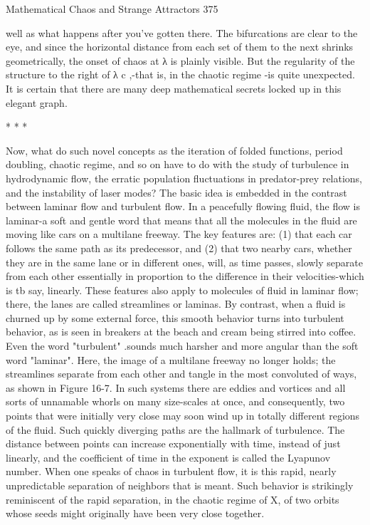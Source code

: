 Mathematical Chaos and Strange Attractors                                             375

well as what happens after you've gotten there. The bifurcations are clear to the eye,
and since the horizontal distance from each set of them to the next shrinks
geometrically, the onset of chaos at λ is plainly visible. But the regularity of the
structure to the right of λ c ,-that is, in the chaotic regime -is quite unexpected. It is
certain that there are many deep mathematical secrets locked up in this elegant graph.

                                        *   *   *

        Now, what do such novel concepts as the iteration of folded functions, period
doubling, chaotic regime, and so on have to do with the study of turbulence in
hydrodynamic flow, the erratic population fluctuations in predator-prey relations, and
the instability of laser modes? The basic idea is embedded in the contrast between
laminar flow and turbulent flow. In a peacefully flowing fluid, the flow is laminar-a
soft and gentle word that means that all the molecules in the fluid are moving like cars
on a multilane freeway. The key features are: (1) that each car follows the same path
as its predecessor, and (2) that two nearby cars, whether they are in the same lane or
in different ones, will, as time passes, slowly separate from each other essentially in
proportion to the difference in their velocities-which is tb say, linearly. These features
also apply to molecules of fluid in laminar flow; there, the lanes are called streamlines
or laminas.
        By contrast, when a fluid is churned up by some external force, this smooth
behavior turns into turbulent behavior, as is seen in breakers at the beach and cream
being stirred into coffee. Even the word "turbulent" .sounds much harsher and more
angular than the soft word "laminar". Here, the image of a multilane freeway no
longer holds; the streamlines separate from each other and tangle in the most
convoluted of ways, as shown in Figure 16-7. In such systems there are eddies and
vortices and all sorts of unnamable whorls on many size-scales at once, and
consequently, two points that were initially very close may soon wind up in totally
different regions of the fluid. Such quickly diverging paths are the hallmark of
turbulence. The distance between points can increase exponentially with time, instead
of just linearly, and the coefficient of time in the exponent is called the Lyapunov
number. When one speaks of chaos in turbulent flow, it is this rapid, nearly
unpredictable separation of neighbors that is meant. Such behavior is strikingly
reminiscent of the rapid separation, in the chaotic regime of X, of two orbits whose
seeds might originally have been very close together.




